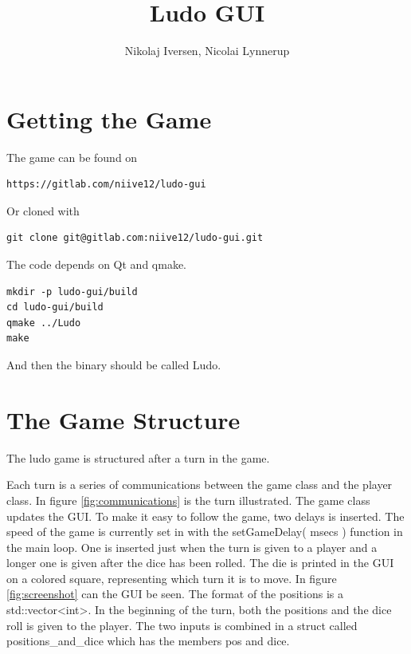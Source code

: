 \documentclass[a4paper,10pt]{article}
\title{Ludo GUI}
\author{Nikolaj Iversen, Nicolai Lynnerup}
\begin{document}
\maketitle

\section{Getting the Game}
The game can be found on
\begin{verbatim}
https://gitlab.com/niive12/ludo-gui
\end{verbatim}
Or cloned with
\begin{verbatim}
git clone git@gitlab.com:niive12/ludo-gui.git
\end{verbatim}
The code depends on Qt and qmake.
\begin{verbatim}
mkdir -p ludo-gui/build
cd ludo-gui/build
qmake ../Ludo
make
\end{verbatim}
And then the binary should be called Ludo.

\section{The Game Structure}
The ludo game is structured after a turn in the game.

Each turn is a series of communications between the game class and the player class.
In figure \ref{fig:communications} is the turn illustrated.
The game class updates the GUI.
To make it easy to follow the game, two delays is inserted.
The speed of the game is currently set in with the setGameDelay( msecs ) function in the main loop.
One is inserted just when the turn is given to a player and a longer one is given after the dice has been rolled.
The die is printed in the GUI on a colored square, representing which turn it is to move.
In figure \ref{fig:screenshot} can the GUI be seen.
The format of the positions is a std::vector<int>.
In the beginning of the turn, both the positions and the dice roll is given to the player.
The two inputs is combined in a struct called positions\_and\_dice which has the members pos and dice.
\end{document}
